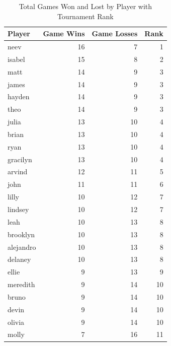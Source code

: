 \documentclass[12pt]{article}
\begin{document}
\begin{table}
\centering
\caption{Total Games Won and Lost by Player with Tournament Rank}
\label{tab:total_game_results}
\begin{tabular}{lrrr}
\toprule
\textbf{Player} & \textbf{Game Wins} & \textbf{Game Losses} & \textbf{Rank} \\
\midrule
neev      & 16 & 7 & 1 \\
isabel    & 15 & 8 & 2 \\
matt      & 14 & 9 & 3 \\
james     & 14 & 9 & 3 \\
hayden    & 14 & 9 & 3 \\
theo      & 14 & 9 & 3 \\
julia     & 13 & 10 & 4 \\
brian     & 13 & 10 & 4 \\
ryan      & 13 & 10 & 4 \\
gracilyn  & 13 & 10 & 4 \\
arvind    & 12 & 11 & 5 \\
john      & 11 & 11 & 6 \\
lilly     & 10 & 12 & 7 \\
lindsey   & 10 & 12 & 7 \\
leah      & 10 & 13 & 8 \\
brooklyn  & 10 & 13 & 8 \\
alejandro & 10 & 13 & 8 \\
delaney   & 10 & 13 & 8 \\
ellie     & 9  & 13 & 9 \\
meredith  & 9  & 14 & 10 \\
bruno     & 9  & 14 & 10 \\
devin     & 9  & 14 & 10 \\
olivia    & 9  & 14 & 10 \\
molly     & 7  & 16 & 11 \\
\bottomrule
\end{tabular}
\end{table}
\end{document}
